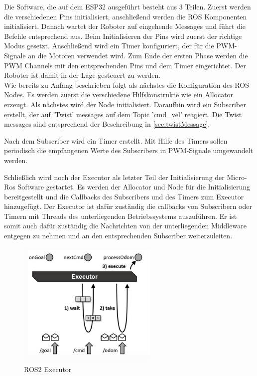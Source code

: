 \begin{flushleft}
    Die Software, die auf dem ESP32 ausgeführt besteht aus 3 Teilen. Zuerst werden die verschiedenen Pins initialisiert, anschließend werden die ROS Komponenten initialisiert. Danach wartet der Roboter auf eingehende Messages und führt die Befehle entsprechend aus.
    Beim Initialisieren der Pins wird zuerst der richtige Modus gesetzt. Anschließend wird ein Timer konfiguriert, der für die PWM-Signale an die Motoren verwendet wird.
    Zum Ende der ersten Phase werden die PWM Channels mit den entsprechenden Pins und dem Timer eingerichtet.
    Der Roboter ist damit in der Lage gesteuert zu werden.\\

    Wie bereits zu Anfang beschrieben folgt als nächstes die Konfiguration des ROS-Nodes.
    Es werden zuerst die verschiedene Hilfskonstrukte wie ein Allocator erzeugt. Als nächstes wird der Node initialisiert.
    Daraufhin wird ein Subscriber erstellt, der auf 'Twist' messages auf dem Topic 'cmd\_vel' reagiert. 
    Die Twist messages sind entsprechend der Beschreibung in \ref{sec:twistMessage}. \newline


    Nach dem Subscriber wird ein Timer erstellt. Mit Hilfe des Timers sollen periodisch die empfangenen Werte des Subscribers in PWM-Signale umgewandelt werden.
    
    Schließlich wird noch der Executor als letzter Teil der Initialisierung der Micro-Ros Software gestartet.
    Es werden der Allocator und Node für die Initialisierung bereitgestellt und die Callbacks des Subscribers und des Timers zum Executor hinzugefügt.
    Der Executor ist dafür zuständig die callbacks von Subscribern oder Timern mit Threads des unterliegenden Betriebssystems auszuführen.
    Er ist somit auch dafür zuständig die Nachrichten von der unterliegenden Middleware entgegen zu nehmen und an den entsprechenden Subscriber weiterzuleiten.\\

    \begin{figure}[h!]
        \centering
        \includegraphics[width=0.6\textwidth]{imgs/ROS2_executor.png}
        \caption{ROS2 Executor}
        \label{fig:ros2_executor}%
    \end{figure}


\end{flushleft}
